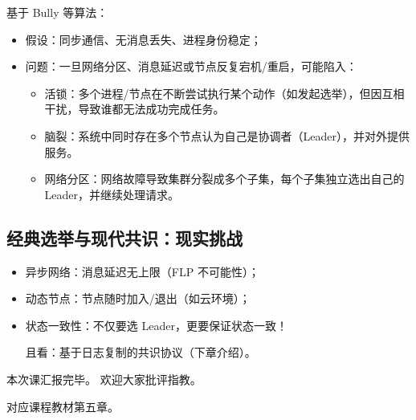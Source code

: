 基于 Bully 等算法：
\begin{itemize}
\item 假设：同步通信、无消息丢失、进程身份稳定；
\item 问题：一旦网络分区、消息延迟或节点反复宕机/重启，可能陷入：
  \begin{itemize}
  \item 活锁：多个进程/节点在不断尝试执行某个动作（如发起选举），但因互相干扰，导致谁都无法成功完成任务。
  \item 脑裂：系统中同时存在多个节点认为自己是协调者（Leader），并对外提供服务。
  \item 网络分区：网络故障导致集群分裂成多个子集，每个子集独立选出自己的 Leader，并继续处理请求。
  \end{itemize}
\end{itemize}

\subsection{经典选举与现代共识：现实挑战}

\begin{itemize}
\item 异步网络：消息延迟无上限（FLP 不可能性）；
\item 动态节点：节点随时加入/退出（如云环境）；
\item 状态一致性：不仅要选 Leader，更要保证状态一致！

且看：基于日志复制的共识协议（下章介绍）。
\end{itemize}

\bigskip

本次课汇报完毕。
欢迎大家批评指教。

对应课程教材第五章。
